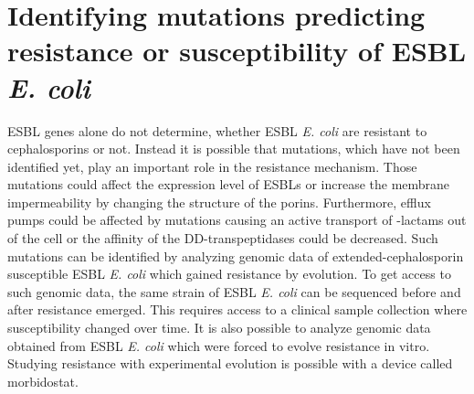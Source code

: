 \section{Identifying mutations predicting resistance or susceptibility of ESBL \textit{E. coli}}
ESBL genes alone do not determine, whether ESBL \textit{E. coli} are resistant to cephalosporins or not. Instead it is possible that mutations, which have not been identified yet, play an important role in the resistance mechanism. Those mutations could affect the expression level of ESBLs or increase the membrane impermeability by changing the structure of the porins. Furthermore, efflux pumps could be affected by mutations causing an active transport of \textbeta-lactams out of the cell or the affinity of the DD-transpeptidases could be decreased.
Such mutations can be identified by analyzing genomic data of extended-cephalosporin susceptible ESBL \textit{E. coli} which gained resistance by evolution. To get access to such genomic data, the same strain of ESBL \textit{E. coli} can be sequenced before and after resistance emerged. This requires access to a clinical sample collection where susceptibility changed over time. It is also possible to analyze genomic data obtained from ESBL \textit{E. coli} which were forced to evolve resistance in vitro. Studying resistance with experimental evolution is possible with a device called morbidostat.

